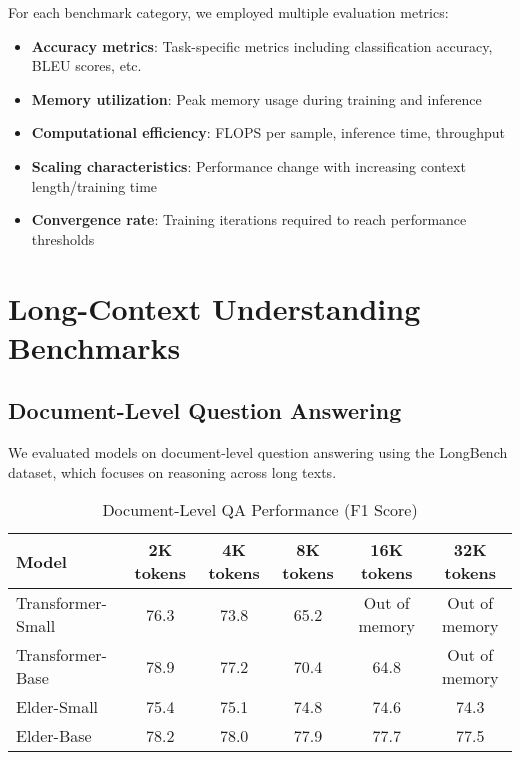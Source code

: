 For each benchmark category, we employed multiple evaluation metrics:

\begin{itemize}
    \item \textbf{Accuracy metrics}: Task-specific metrics including classification accuracy, BLEU scores, etc.
    \item \textbf{Memory utilization}: Peak memory usage during training and inference
    \item \textbf{Computational efficiency}: FLOPS per sample, inference time, throughput
    \item \textbf{Scaling characteristics}: Performance change with increasing context length/training time
    \item \textbf{Convergence rate}: Training iterations required to reach performance thresholds
\end{itemize}

\section{Long-Context Understanding Benchmarks}

\subsection{Document-Level Question Answering}

We evaluated models on document-level question answering using the LongBench dataset, which focuses on reasoning across long texts.

\begin{table}[h]
\centering
\caption{Document-Level QA Performance (F1 Score)}
\label{tab:document_qa}
\begin{tabular}{|l|c|c|c|c|c|}
\hline
\textbf{Model} & \textbf{2K tokens} & \textbf{4K tokens} & \textbf{8K tokens} & \textbf{16K tokens} & \textbf{32K tokens} \\
\hline
Transformer-Small & 76.3 & 73.8 & 65.2 & Out of memory & Out of memory \\
Transformer-Base & 78.9 & 77.2 & 70.4 & 64.8 & Out of memory \\
Elder-Small & 75.4 & 75.1 & 74.8 & 74.6 & 74.3 \\
Elder-Base & 78.2 & 78.0 & 77.9 & 77.7 & 77.5 \\
\hline
\end{tabular}
\end{table}

